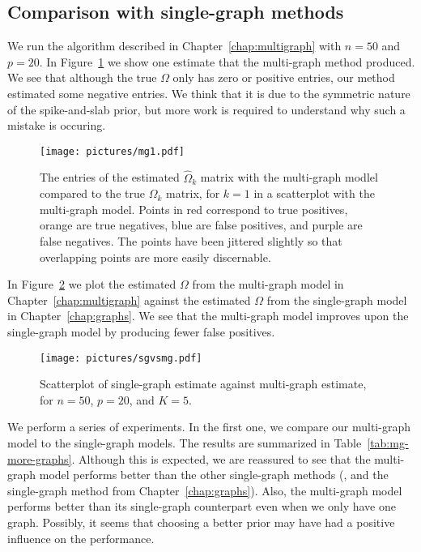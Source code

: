 \documentclass[a4paper, 11pt, oneside]{report}
\newcommand{\1}{\mathds{1}}
\begin{document}
\subsection{Comparison with single-graph methods}
We run the algorithm described in Chapter~\ref{chap:multigraph} with $n=50$ and $p=20$.
In Figure~\ref{fig:omega-mg} we show one estimate that the multi-graph method produced. 
We see that although the true $\Omega$ only has zero or positive entries, our method estimated some negative entries.
We think that it is due to the symmetric nature of the spike-and-slab prior, but more work is required to understand why such a mistake is occuring.
\begin{figure}[ht]
  \centering
    \texttt{[image: pictures/mg1.pdf]}
  \caption{The entries of the estimated $\hat \Omega_k$ matrix with the multi-graph modlel compared to the true $\Omega_k$ matrix, for $k = 1$ in
a scatterplot with the multi-graph model. Points in red correspond to true positives, orange are true negatives, blue are false positives, and purple are false negatives. The points have been jittered slightly so that overlapping points are more easily discernable.}
\label{fig:omega-mg}
\end{figure}
In Figure~\ref{fig:sgvsmg} we plot the estimated $\Omega$ from the multi-graph model in Chapter~\ref{chap:multigraph} against the estimated $\Omega$ from the single-graph model in Chapter~\ref{chap:graphs}.
We see that the multi-graph model improves upon the single-graph model by producing fewer false positives.
\begin{figure}
  \begin{center}
    \texttt{[image: pictures/sgvsmg.pdf]}
  \end{center}
  \caption{Scatterplot of single-graph estimate against multi-graph estimate, for $n=50$, $p=20$, and $K=5$.}
  \label{fig:sgvsmg}
\end{figure}

We perform a series of experiments. In the first one, we compare our multi-graph model to the single-graph models.
The results are summarized in Table~\ref{tab:mg-more-graphs}. 
Although this is expected, we are reassured to see that the multi-graph model performs better than the other single-graph methods (\cite{mein2006}, and the single-graph method from Chapter~\ref{chap:graphs}).
Also, the multi-graph model performs better than its single-graph counterpart even when we only have one graph.
Possibly, it seems that choosing a better prior may have had a positive influence on the performance.
\end{document}
